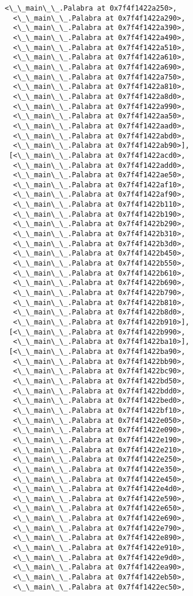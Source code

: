 \documentclass[12pt,a4paper,table]{article}
\begin{document}
\begin{tcolorbox}[breakable, size=fbox, boxrule=.5pt, pad at break*=1mm, opacityfill=0]
\begin{Verbatim}[commandchars=\\\{\}]
  <\_\_main\_\_.Palabra at 0x7f4f1422a250>,
  <\_\_main\_\_.Palabra at 0x7f4f1422a290>,
  <\_\_main\_\_.Palabra at 0x7f4f1422a390>,
  <\_\_main\_\_.Palabra at 0x7f4f1422a490>,
  <\_\_main\_\_.Palabra at 0x7f4f1422a510>,
  <\_\_main\_\_.Palabra at 0x7f4f1422a610>,
  <\_\_main\_\_.Palabra at 0x7f4f1422a690>,
  <\_\_main\_\_.Palabra at 0x7f4f1422a750>,
  <\_\_main\_\_.Palabra at 0x7f4f1422a810>,
  <\_\_main\_\_.Palabra at 0x7f4f1422a8d0>,
  <\_\_main\_\_.Palabra at 0x7f4f1422a990>,
  <\_\_main\_\_.Palabra at 0x7f4f1422aa50>,
  <\_\_main\_\_.Palabra at 0x7f4f1422aad0>,
  <\_\_main\_\_.Palabra at 0x7f4f1422abd0>,
  <\_\_main\_\_.Palabra at 0x7f4f1422ab90>],
 [<\_\_main\_\_.Palabra at 0x7f4f1422acd0>,
  <\_\_main\_\_.Palabra at 0x7f4f1422add0>,
  <\_\_main\_\_.Palabra at 0x7f4f1422ae50>,
  <\_\_main\_\_.Palabra at 0x7f4f1422af10>,
  <\_\_main\_\_.Palabra at 0x7f4f1422af90>,
  <\_\_main\_\_.Palabra at 0x7f4f1422b110>,
  <\_\_main\_\_.Palabra at 0x7f4f1422b190>,
  <\_\_main\_\_.Palabra at 0x7f4f1422b290>,
  <\_\_main\_\_.Palabra at 0x7f4f1422b310>,
  <\_\_main\_\_.Palabra at 0x7f4f1422b3d0>,
  <\_\_main\_\_.Palabra at 0x7f4f1422b450>,
  <\_\_main\_\_.Palabra at 0x7f4f1422b550>,
  <\_\_main\_\_.Palabra at 0x7f4f1422b610>,
  <\_\_main\_\_.Palabra at 0x7f4f1422b690>,
  <\_\_main\_\_.Palabra at 0x7f4f1422b790>,
  <\_\_main\_\_.Palabra at 0x7f4f1422b810>,
  <\_\_main\_\_.Palabra at 0x7f4f1422b8d0>,
  <\_\_main\_\_.Palabra at 0x7f4f1422b910>],
 [<\_\_main\_\_.Palabra at 0x7f4f1422b990>,
  <\_\_main\_\_.Palabra at 0x7f4f1422ba10>],
 [<\_\_main\_\_.Palabra at 0x7f4f1422ba90>,
  <\_\_main\_\_.Palabra at 0x7f4f1422bb90>,
  <\_\_main\_\_.Palabra at 0x7f4f1422bc90>,
  <\_\_main\_\_.Palabra at 0x7f4f1422bd50>,
  <\_\_main\_\_.Palabra at 0x7f4f1422bdd0>,
  <\_\_main\_\_.Palabra at 0x7f4f1422bed0>,
  <\_\_main\_\_.Palabra at 0x7f4f1422bf10>,
  <\_\_main\_\_.Palabra at 0x7f4f1422e050>,
  <\_\_main\_\_.Palabra at 0x7f4f1422e090>,
  <\_\_main\_\_.Palabra at 0x7f4f1422e190>,
  <\_\_main\_\_.Palabra at 0x7f4f1422e210>,
  <\_\_main\_\_.Palabra at 0x7f4f1422e250>,
  <\_\_main\_\_.Palabra at 0x7f4f1422e350>,
  <\_\_main\_\_.Palabra at 0x7f4f1422e450>,
  <\_\_main\_\_.Palabra at 0x7f4f1422e4d0>,
  <\_\_main\_\_.Palabra at 0x7f4f1422e590>,
  <\_\_main\_\_.Palabra at 0x7f4f1422e650>,
  <\_\_main\_\_.Palabra at 0x7f4f1422e690>,
  <\_\_main\_\_.Palabra at 0x7f4f1422e790>,
  <\_\_main\_\_.Palabra at 0x7f4f1422e890>,
  <\_\_main\_\_.Palabra at 0x7f4f1422e910>,
  <\_\_main\_\_.Palabra at 0x7f4f1422e9d0>,
  <\_\_main\_\_.Palabra at 0x7f4f1422ea90>,
  <\_\_main\_\_.Palabra at 0x7f4f1422eb50>,
  <\_\_main\_\_.Palabra at 0x7f4f1422ec50>,

\end{Verbatim}
\end{tcolorbox}
\end{document}
